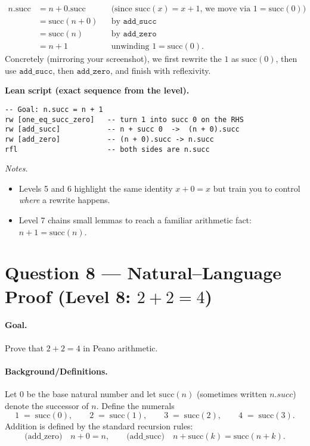 \documentclass{article}
\theoremstyle{theorem}
\theoremstyle{definition}
\theoremstyle{remark}
\begin{document}
\begin{solution}
\[
\begin{aligned}
n.\mathrm{succ}
&= n + 0.\mathrm{succ} &&\text{(since } \mathrm{succ}(x) = x+1 \text{, we move via }1=\mathrm{succ}(0))\\
&= \mathrm{succ}(n + 0) &&\text{by } \texttt{add\_succ}\\
&= \mathrm{succ}(n) &&\text{by } \texttt{add\_zero}\\
&= n + 1 &&\text{unwinding } 1=\mathrm{succ}(0).
\end{aligned}
\]
Concretely (mirroring your screenshot), we first rewrite the \(1\) as \(\mathrm{succ}(0)\), then use \(\texttt{add\_succ}\), then \(\texttt{add\_zero}\), and finish with reflexivity.
\medskip

\noindent\textbf{Lean script (exact sequence from the level).}
\begin{lstlisting}
-- Goal: n.succ = n + 1
rw [one_eq_succ_zero]   -- turn 1 into succ 0 on the RHS
rw [add_succ]           -- n + succ 0  ->  (n + 0).succ
rw [add_zero]           -- (n + 0).succ -> n.succ
rfl                     -- both sides are n.succ
\end{lstlisting}
\end{solution}

\bigskip\bigskip
\noindent\emph{Notes.}
\begin{itemize}
  \item Levels 5 and 6 highlight the same identity \(x+0=x\) but train you to control \emph{where} a rewrite happens.
  \item Level 7 chains small lemmas to reach a familiar arithmetic fact: \(n+1=\mathrm{succ}(n)\).
\end{itemize}

\section*{Question 8 — Natural–Language Proof (Level 8: $2+2=4$)}

\paragraph{Goal.} Prove that $2+2=4$ in Peano arithmetic.

\paragraph{Background/Definitions.}
Let $0$ be the base natural number and let $\mathrm{succ}(n)$ (sometimes written $n.succ$) denote the successor of $n$.
Define the numerals
\[
1 \;=\; \mathrm{succ}(0),\qquad
2 \;=\; \mathrm{succ}(1),\qquad
3 \;=\; \mathrm{succ}(2),\qquad
4 \;=\; \mathrm{succ}(3).
\]
Addition is defined by the standard recursion rules:
\[
\text{(add\_zero)}\quad n+0=n,
\qquad
\text{(add\_succ)}\quad n+\mathrm{succ}(k)=\mathrm{succ}(n+k).
\]
\end{document}
